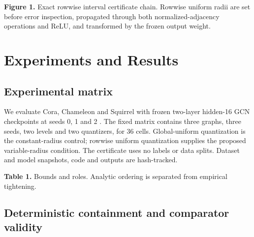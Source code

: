 \documentclass{article}
\begin{document}
\textbf{Figure 1.} Exact rowwise interval certificate chain. Rowwise uniform radii are set before error inspection, propagated through both normalized-adjacency operations and ReLU, and transformed by the frozen output weight.

\section{Experiments and Results}


\subsection{Experimental matrix}


We evaluate Cora, Chameleon and Squirrel with frozen two-layer hidden-16 GCN checkpoints at seeds 0, 1 and 2 \cite{yang2016planetoid,pei2020geomgnn,platonov2023heterophily}. The fixed matrix contains three graphs, three seeds, two levels and two quantizers, for 36 cells. Global-uniform quantization is the constant-radius control; rowwise uniform quantization supplies the proposed variable-radius condition. The certificate uses no labels or data splits. Dataset and model snapshots, code and outputs are hash-tracked.

\begin{table}[ht]
\centering
\caption{Comparison of Bound or control across Exact definition, Role}
\end{table}

\textbf{Table 1.} Bounds and roles. Analytic ordering is separated from empirical tightening.

\subsection{Deterministic containment and comparator validity}
\end{document}
